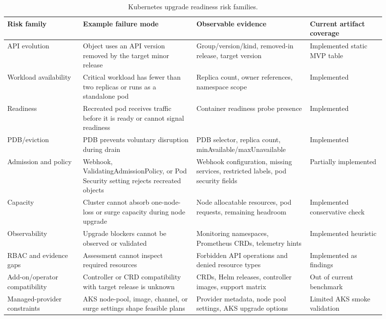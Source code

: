 \documentclass[10pt,journal]{IEEEtran}
\begin{document}
\begin{table}[t]
  \centering
  \caption{Kubernetes upgrade readiness risk families.}
  \label{tab:risk-taxonomy}
  \begin{tabular}{p{0.18\linewidth}p{0.27\linewidth}p{0.27\linewidth}p{0.18\linewidth}}
    \toprule
    Risk family & Example failure mode & Observable evidence & Current artifact coverage \\
    \midrule
    API evolution & Object uses an API version removed by the target minor release & Group/version/kind, removed-in release, target version & Implemented static MVP table \\
    Workload availability & Critical workload has fewer than two replicas or runs as a standalone pod & Replica count, owner references, namespace scope & Implemented \\
    Readiness & Recreated pod receives traffic before it is ready or cannot signal readiness & Container readiness probe presence & Implemented \\
    PDB/eviction & PDB prevents voluntary disruption during drain & PDB selector, replica count, minAvailable/maxUnavailable & Implemented \\
    Admission and policy & Webhook, ValidatingAdmissionPolicy, or Pod Security setting rejects recreated objects & Webhook configuration, missing services, restricted labels, pod security fields & Partially implemented \\
    Capacity & Cluster cannot absorb one-node-loss or surge capacity during node upgrade & Node allocatable resources, pod requests, remaining headroom & Implemented conservative check \\
    Observability & Upgrade blockers cannot be observed or validated & Monitoring namespaces, Prometheus CRDs, telemetry hints & Implemented heuristic \\
    RBAC and evidence gaps & Assessment cannot inspect required resources & Forbidden API operations and denied resource types & Implemented as findings \\
    Add-on/operator compatibility & Controller or CRD compatibility with target release is unknown & CRDs, Helm releases, controller images, support matrix & Out of current benchmark \\
    Managed-provider constraints & AKS node-pool, image, channel, or surge settings shape feasible plans & Provider metadata, node pool settings, AKS upgrade options & Limited AKS smoke validation \\
    \bottomrule
  \end{tabular}
\end{table}
\end{document}
